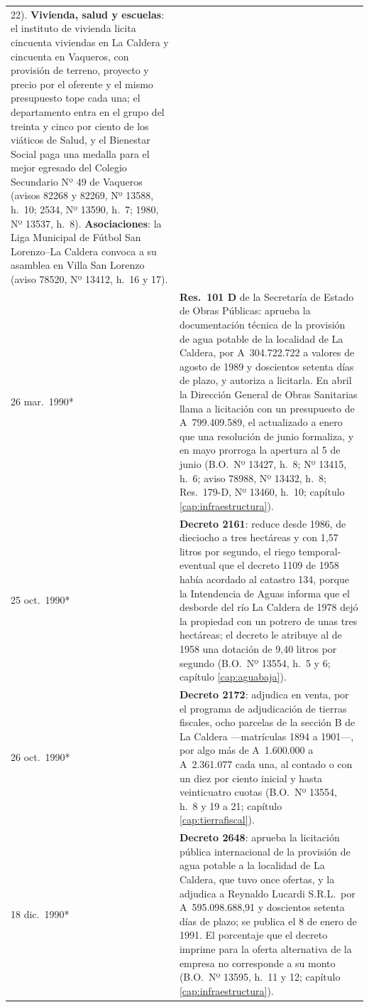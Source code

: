 \begin{longtable}{@{}p{2.7cm}p{10.3cm}@{}}
22). \textbf{Vivienda, salud y escuelas}: el instituto de vivienda licita cincuenta viviendas en La Caldera y cincuenta en Vaqueros, con provisión de terreno, proyecto y precio por el oferente y el mismo presupuesto tope cada una; el departamento entra en el grupo del treinta y cinco por ciento de los viáticos de Salud, y el Bienestar Social paga una medalla para el mejor egresado del Colegio Secundario Nº 49 de Vaqueros (avisos 82268 y 82269, Nº 13588, h.\ 10; 2534, Nº 13590, h.\ 7; 1980, Nº 13537, h.\ 8). \textbf{Asociaciones}: la Liga Municipal de Fútbol San Lorenzo--La Caldera convoca a su asamblea en Villa San Lorenzo (aviso 78520, Nº 13412, h.\ 16 y 17). \\
26 mar.\ 1990* & \textbf{Res.\ 101 D} de la Secretaría de Estado de Obras Públicas: aprueba la documentación técnica de la provisión de agua potable de la localidad de La Caldera, por A~304.722.722 a valores de agosto de 1989 y doscientos setenta días de plazo, y autoriza a licitarla. En abril la Dirección General de Obras Sanitarias llama a licitación con un presupuesto de A~799.409.589, el actualizado a enero que una resolución de junio formaliza, y en mayo prorroga la apertura al 5 de junio (B.O.\ Nº 13427, h.\ 8; Nº 13415, h.\ 6; aviso 78988, Nº 13432, h.\ 8; Res.\ 179-D, Nº 13460, h.\ 10; capítulo \ref{cap:infraestructura}). \\
25 oct.\ 1990* & \textbf{Decreto 2161}: reduce desde 1986, de dieciocho a tres hectáreas y con 1,57 litros por segundo, el riego temporal-eventual que el decreto 1109 de 1958 había acordado al catastro 134, porque la Intendencia de Aguas informa que el desborde del río La Caldera de 1978 dejó la propiedad con un potrero de unas tres hectáreas; el decreto le atribuye al de 1958 una dotación de 9,40 litros por segundo (B.O.\ Nº 13554, h.\ 5 y 6; capítulo \ref{cap:aguabaja}). \\
26 oct.\ 1990* & \textbf{Decreto 2172}: adjudica en venta, por el programa de adjudicación de tierras fiscales, ocho parcelas de la sección B de La Caldera ---matrículas 1894 a 1901---, por algo más de A~1.600.000 a A~2.361.077 cada una, al contado o con un diez por ciento inicial y hasta veinticuatro cuotas (B.O.\ Nº 13554, h.\ 8 y 19 a 21; capítulo \ref{cap:tierrafiscal}). \\
18 dic.\ 1990* & \textbf{Decreto 2648}: aprueba la licitación pública internacional de la provisión de agua potable a la localidad de La Caldera, que tuvo once ofertas, y la adjudica a Reynaldo Lucardi S.R.L.\ por A~595.098.688,91 y doscientos setenta días de plazo; se publica el 8 de enero de 1991. El porcentaje que el decreto imprime para la oferta alternativa de la empresa no corresponde a su monto (B.O.\ Nº 13595, h.\ 11 y 12; capítulo \ref{cap:infraestructura}). \\

\end{longtable}
